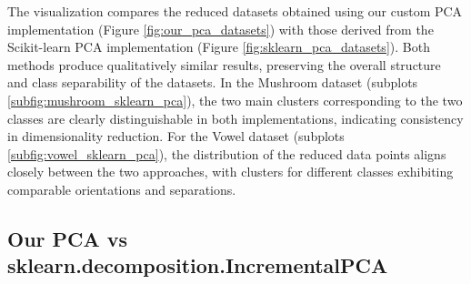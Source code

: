 The visualization compares the reduced datasets obtained using our custom PCA implementation (Figure \ref{fig:our_pca_datasets}) 
with those derived from the Scikit-learn PCA implementation (Figure \ref{fig:sklearn_pca_datasets}).
Both methods produce qualitatively similar results, preserving the overall structure and class separability of the datasets.
In the Mushroom dataset (subplots \ref{subfig:mushroom_sklearn_pca}), the two main clusters corresponding to the two classes are clearly distinguishable in both implementations,
indicating consistency in dimensionality reduction. For the Vowel dataset (subplots \ref{subfig:vowel_sklearn_pca}),
the distribution of the reduced data points aligns closely between the two approaches, with clusters for different classes exhibiting comparable orientations and separations.







\subsection{Our PCA vs sklearn.decomposition.IncrementalPCA}
\label{subsec:pca-vs-incremental-pca}


